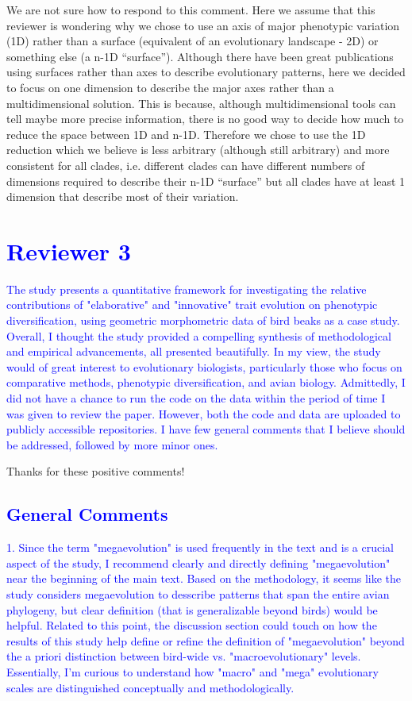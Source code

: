 \documentclass[12pt,letterpaper]{article}
\begin{document}
{We are not sure how to respond to this comment. Here we assume that this reviewer is wondering why we chose to use an axis of major phenotypic variation (1D) rather than a surface (equivalent of an evolutionary landscape - 2D) or something else (a n-1D “surface”). Although there have been great publications using surfaces rather than axes to describe evolutionary patterns, here we decided to focus on one dimension to describe the major axes rather than a multidimensional solution. This is because, although multidimensional tools can tell maybe more precise information, there is no good way to decide how much to reduce the space between 1D and n-1D. Therefore we chose to use the 1D reduction which we believe is less arbitrary (although still arbitrary) and more consistent for all clades, i.e. different clades can have different numbers of dimensions required to describe their n-1D “surface” but all clades have at least 1 dimension that describe most of their variation.

\section*{\textcolor{blue}{Reviewer 3}}

\textcolor{blue}{The study presents a quantitative framework for investigating the relative contributions of "elaborative" and "innovative" trait evolution on phenotypic diversification, using geometric morphometric data of bird beaks as a case study. Overall, I thought the study provided a compelling synthesis of methodological and empirical advancements, all presented beautifully. In my view, the study would of great interest to evolutionary biologists, particularly those who focus on comparative methods, phenotypic diversification, and avian biology. Admittedly, I did not have a chance to run the code on the data within the period of time I was given to review the paper. However, both the code and data are uploaded to publicly accessible repositories. I have few general comments that I believe should be addressed, followed by more minor ones.}

Thanks for these positive comments!

\subsection*{\textcolor{blue}{General Comments}}

\textcolor{blue}{1. Since the term "megaevolution" is used frequently in the text and is a crucial aspect of the study, I recommend clearly and directly defining "megaevolution" near the beginning of the main text. Based on the methodology, it seems like the study considers megaevolution to desscribe patterns that span the entire avian phylogeny, but clear definition (that is generalizable beyond birds) would be helpful. Related to this point, the discussion section could touch on how the results of this study help define or refine the definition of "megaevolution" beyond the a priori distinction between bird-wide vs. "macroevolutionary" levels. Essentially, I'm curious to understand how "macro" and "mega" evolutionary scales are distinguished conceptually and methodologically.}

}
\end{document}
